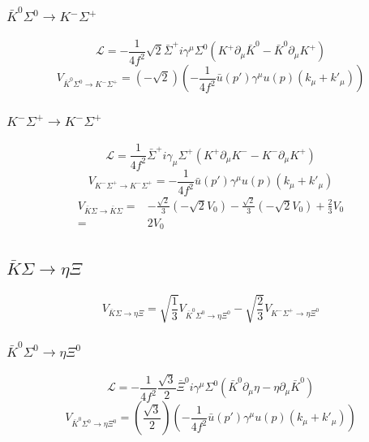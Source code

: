 \subsubsection{$\bar{K}^{0}\Sigma^{0}\rightarrow K^{-}\Sigma^{+}$}
\begin{equation}
	\mathcal{L}=-\frac{1}{4f^2}\sqrt{2}\bar{\Sigma}^{+}i\gamma^{\mu}\Sigma^{0}(K^{+}\partial_{\mu}\bar{K}^{0}-\bar{K}^{0}\partial_{\mu}K^{+})
\end{equation}
\begin{equation}
	V_{\bar{K}^{0}\Sigma^{0}\rightarrow K^{-}\Sigma^{+}}=\left(-\sqrt{2}\right)\left(-\frac{1}{4f^2}\bar{u}(p')\gamma^{\mu}u(p)(k_{\mu}+k'_{\mu})\right)
\end{equation}
\subsubsection{$K^{-}\Sigma^{+}\rightarrow K^{-}\Sigma^{+}$}
\begin{equation}
	\mathcal{L}=\frac{1}{4f^2}\bar{\Sigma}^{+}i\gamma_{\mu}\Sigma^{+}(K^{+}\partial_{\mu}K^{-}-K^{-}\partial_{\mu}K^{+})
\end{equation}
\begin{equation}
	V_{K^{-}\Sigma^{+}\rightarrow K^{-}\Sigma^{+}}=-\frac{1}{4f^2}\bar{u}(p')\gamma^{\mu}u(p)(k_{\mu}+k'_{\mu})
\end{equation}
\begin{equation}
\begin{split}
	V_{\bar{K}\Sigma\rightarrow \bar{K}\Sigma}=&-\frac{\sqrt{2}}{3}(-\sqrt{2}V_{0})-\frac{\sqrt{2}}{3}(-\sqrt{2}V_{0})+\frac{2}{3}V_{0}\\
	=&2V_{0}
\end{split}
\end{equation}
\subsection{$\bar{K}\Sigma\rightarrow\eta\Xi$}
\begin{equation}
	V_{\bar{K}\Sigma\rightarrow\eta\Xi}=\sqrt{\frac{1}{3}}V_{\bar{K}^{0}\Sigma^{0}\rightarrow\eta\Xi^{0}}-\sqrt{\frac{2}{3}}V_{K^{-}\Sigma^{+}\rightarrow\eta\Xi^{0}}
\end{equation}
\subsubsection{$\bar{K}^{0}\Sigma^{0}\rightarrow\eta\Xi^{0}$}
\begin{equation}
	\mathcal{L}=-\frac{1}{4f^2}\frac{\sqrt{3}}{2}\bar{\Xi}^{0}i\gamma^{\mu}\Sigma^{0}(\bar{K}^{0}\partial_{\mu}\eta-\eta\partial_{\mu}\bar{K}^{0})
\end{equation}
\begin{equation}
	V_{\bar{K}^{0}\Sigma^{0}\rightarrow\eta\Xi^{0}}=\left(\frac{\sqrt{3}}{2}\right)\left(-\frac{1}{4f^2}\bar{u}(p')\gamma^{\mu}u(p)(k_{\mu}+k'_{\mu})\right)
\end{equation}
